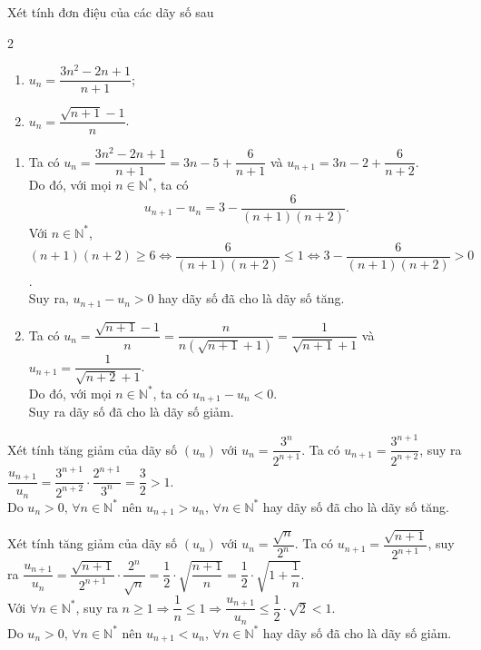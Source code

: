 \begin{bt}%
	Xét tính đơn điệu của các dãy số sau
	\begin{multicols}{2}
		\begin{enumerate}
			\item $u_n=\dfrac{3n^2-2n+1}{n+1}$;
			\item $u_n=\dfrac{\sqrt{n+1}-1}{n}$.
		\end{enumerate}
	\end{multicols}
	\loigiai 
	{
		\begin{enumerate}
			\item Ta có $u_n=\dfrac{3n^2-2n+1}{n+1}=3n-5+\dfrac{6}{n+1}$ và $u_{n+1}=3n-2+\dfrac{6}{n+2}$.\\
			Do đó, với mọi $n\in \mathbb{N}^*$, ta có $$u_{n+1}-u_n=3-\dfrac{6}{(n+1)(n+2)}.$$
			Với $n\in \mathbb{N}^*$, $(n+1)(n+2)\ge 6\Leftrightarrow \dfrac{6}{(n+1)(n+2)}\le 1\Leftrightarrow 3-\dfrac{6}{(n+1)(n+2)}>0$.\\
			Suy ra, $u_{n+1}-u_n>0$ hay dãy số đã cho là dãy số tăng.
			\item Ta có $u_n=\dfrac{\sqrt{n+1}-1}{n}=\dfrac{n}{n\left(\sqrt{n+1}+1\right)}=\dfrac{1}{\sqrt{n+1}+1}$ và $u_{n+1}=\dfrac{1}{\sqrt{n+2}+1}$.\\
			Do đó, với mọi $n\in \mathbb{N}^*$, ta có $u_{n+1}-u_n<0$.\\
			Suy ra dãy số đã cho là dãy số giảm.
		\end{enumerate}
	}
\end{bt}

\begin{bt}%
Xét tính tăng giảm của dãy số $(u_n)$ với $u_n=\dfrac{3^n}{2^{n+1}}$.
	\loigiai 
	{
	Ta có $u_{n+1}=\dfrac{3^{n+1}}{2^{n+2}}$, suy ra $\dfrac{u_{n+1}}{u_n}=\dfrac{3^{n+1}}{2^{n+2}}\cdot \dfrac{2^{n+1}}{3^n}=\dfrac{3}{2}>1$.\\
	Do $u_n>0,\, \forall n\in\mathbb{N}^*$ nên $u_{n+1}>u_n, \, \forall n\in\mathbb{N}^*$ hay dãy số đã cho là dãy số tăng.
	}
\end{bt}

\begin{bt}%
	Xét tính tăng giảm của dãy số $(u_n)$ với $u_n=\dfrac{\sqrt{n}}{2^n}$.
	\loigiai 
	{
		Ta có $u_{n+1}=\dfrac{\sqrt{n+1}}{2^{n+1}}$, suy ra $\dfrac{u_{n+1}}{u_n}=\dfrac{\sqrt{n+1}}{2^{n+1}}\cdot \dfrac{2^n}{\sqrt{n}}=\dfrac{1}{2}\cdot\sqrt{\dfrac{n+1}{n}}=\dfrac{1}{2}\cdot\sqrt{1+\dfrac{1}{n}}$.\\
		Với $\forall n\in\mathbb{N}^*$, suy ra $n\ge 1\Rightarrow \dfrac{1}{n}\le 1\Rightarrow\dfrac{u_{n+1}}{u_n}\le \dfrac{1}{2}\cdot\sqrt{2}<1$.\\
		Do $u_n>0,\, \forall n\in\mathbb{N}^*$ nên $u_{n+1}<u_n, \, \forall n\in\mathbb{N}^*$ hay dãy số đã cho là dãy số giảm.
	}
\end{bt}

